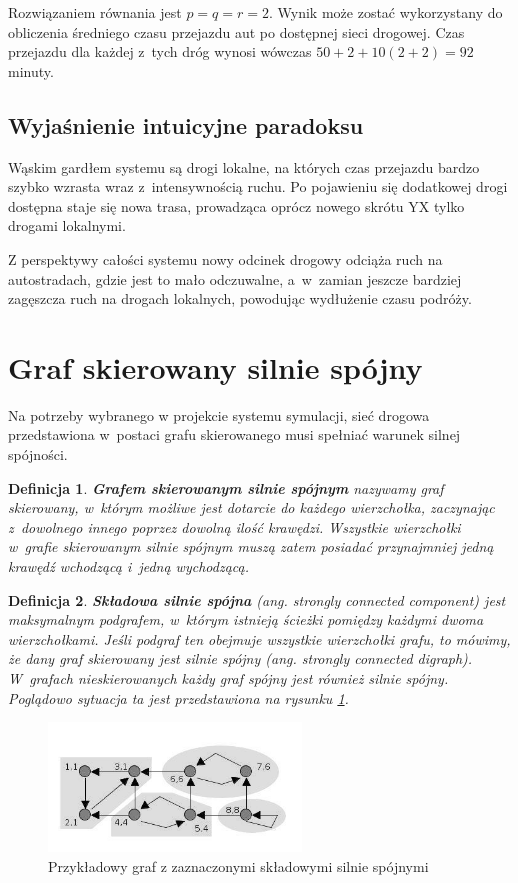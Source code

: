 \documentclass[twoside,12pt]{report}
\newtheorem{definition}{Definicja} %
\begin{document}
Rozwiązaniem równania jest $p=q=r=2$. Wynik może zostać wykorzystany do obliczenia średniego czasu przejazdu aut po dostępnej sieci drogowej. Czas przejazdu dla każdej z~tych dróg wynosi wówczas $50+2+10(2+2)=92$ minuty.

\subsection{Wyjaśnienie intuicyjne paradoksu}
Wąskim gardłem systemu są drogi lokalne, na których czas przejazdu bardzo szybko wzrasta wraz z~intensywnością ruchu. Po pojawieniu się dodatkowej drogi dostępna staje się nowa trasa, prowadząca oprócz nowego skrótu YX tylko drogami lokalnymi.

Z perspektywy całości systemu nowy odcinek drogowy odciąża ruch na autostradach, gdzie jest to mało odczuwalne, a~w~zamian jeszcze bardziej zagęszcza ruch na drogach lokalnych, powodując wydłużenie czasu podróży.

\section{Graf skierowany silnie spójny}
Na potrzeby wybranego w projekcie systemu symulacji, sieć drogowa przedstawiona w~postaci grafu skierowanego musi spełniać warunek silnej spójności. 

\begin{definition}
\textbf{Grafem skierowanym silnie spójnym} nazywamy graf skierowany, w~którym możliwe jest dotarcie do każdego wierzchołka, zaczynając z~dowolnego innego poprzez dowolną ilość krawędzi. Wszystkie wierzchołki w~grafie skierowanym silnie spójnym muszą zatem posiadać przynajmniej jedną krawędź wchodzącą i~jedną wychodzącą\cite{silniespojny}.
\end{definition}

\begin{definition}
\textbf{Składowa silnie spójna} (ang. strongly connected component) jest maksymalnym podgrafem, w~którym istnieją ścieżki pomiędzy każdymi dwoma wierzchołkami. Jeśli podgraf ten obejmuje wszystkie wierzchołki grafu, to mówimy, że dany graf skierowany jest silnie spójny (ang. strongly connected digraph). W~grafach nieskierowanych każdy graf spójny jest również silnie spójny. Poglądowo sytuacja ta jest przedstawiona na rysunku \ref{fig:ex_silnie_spojna}.
\end{definition}

\begin{figure}[ht]
	\centering
	\includegraphics[width=0.6\textwidth]{img/tajran}
	\caption{Przykładowy graf z zaznaczonymi składowymi silnie spójnymi}
	\label{fig:ex_silnie_spojna}
\end{figure}
\end{document}
